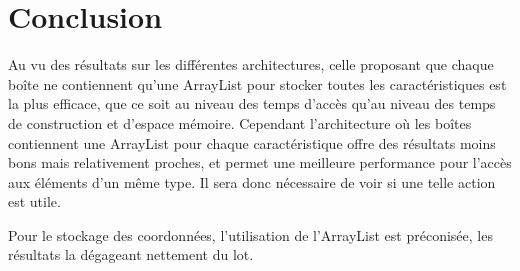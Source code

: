 \section{Conclusion}
Au vu des résultats sur les différentes architectures, celle proposant que chaque boîte ne contiennent qu'une ArrayList pour stocker toutes les caractéristiques est la plus efficace, que ce soit au niveau des temps d'accès qu'au niveau des temps de construction et d'espace mémoire. Cependant l'architecture où les boîtes contiennent une ArrayList pour chaque caractéristique offre des résultats moins bons mais relativement proches, et permet une meilleure performance pour l'accès aux éléments d'un même type. Il sera donc nécessaire de voir si une telle action est utile.

Pour le stockage des coordonnées, l'utilisation de l'ArrayList est préconisée, les résultats la dégageant nettement du lot. 
